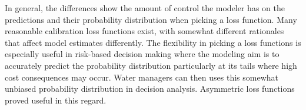 In general, the differences show the amount of control the modeler has on the predictions and their probability distribution when picking a loss function. Many reasonable calibration loss functions exist, with somewhat different rationales that affect model estimates differently. The flexibility in picking a loss functions is especially useful in risk-based decision making where the modeling aim is to accurately predict the probability distribution particularly at its tails where high cost consequences may occur. Water managers can then uses this somewhat unbiased probability distribution in decision analysis. Asymmetric loss functions proved useful in this regard. 




